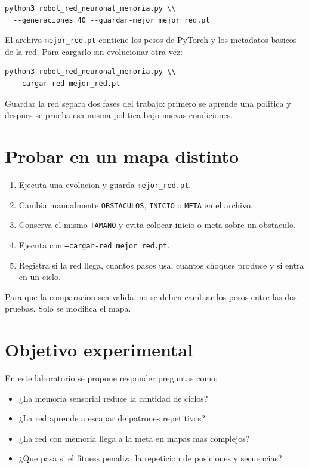 \documentclass[11pt,a4paper]{article}
\begin{document}
\begin{lstlisting}[style=python]
python3 robot_red_neuronal_memoria.py \\
  --generaciones 40 --guardar-mejor mejor_red.pt
\end{lstlisting}

El archivo \texttt{mejor\_red.pt} contiene los pesos de PyTorch y los metadatos basicos de la red. Para cargarlo sin evolucionar otra vez:

\begin{lstlisting}[style=python]
python3 robot_red_neuronal_memoria.py \\
  --cargar-red mejor_red.pt
\end{lstlisting}

\begin{idea}
Guardar la red separa dos fases del trabajo: primero se aprende una politica y despues se prueba esa misma politica bajo nuevas condiciones.
\end{idea}

\section{Probar en un mapa distinto}
\begin{enumerate}[leftmargin=*]
  \item Ejecuta una evolucion y guarda \texttt{mejor\_red.pt}.
  \item Cambia manualmente \texttt{OBSTACULOS}, \texttt{INICIO} o \texttt{META} en el archivo.
  \item Conserva el mismo \texttt{TAMANO} y evita colocar inicio o meta sobre un obstaculo.
  \item Ejecuta con \texttt{--cargar-red mejor\_red.pt}.
  \item Registra si la red llega, cuantos pasos usa, cuantos choques produce y si entra en un ciclo.
\end{enumerate}

Para que la comparacion sea valida, no se deben cambiar los pesos entre las dos pruebas. Solo se modifica el mapa.

\section{Objetivo experimental}
En este laboratorio se propone responder preguntas como:

\begin{itemize}[leftmargin=*]
  \item ¿La memoria sensorial reduce la cantidad de ciclos?
  \item ¿La red aprende a escapar de patrones repetitivos?
  \item ¿La red con memoria llega a la meta en mapas mas complejos?
  \item ¿Que pasa si el fitness penaliza la repeticion de posiciones y secuencias?
\end{itemize}
\end{document}
